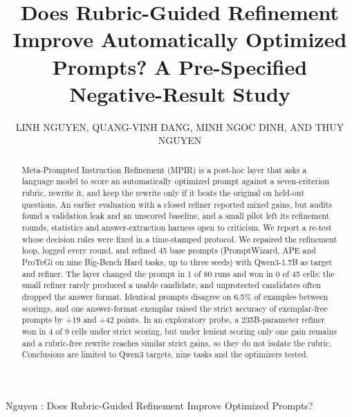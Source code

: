 \documentclass{ieeeaccess}
\begin{document}
\renewcommand{\thesection}{\arabic{section}}
\renewcommand{\thesubsection}{\thesection.\arabic{subsection}}
\renewcommand{\thesubsubsection}{\thesubsection.\arabic{subsubsection}}
\def\thesectiondis{\thesection.}
\def\thesubsectiondis{\thesection.\arabic{subsection}}
\def\thesubsubsectiondis{\thesection.\arabic{subsection}.\arabic{subsubsection}}


\title{Does Rubric-Guided Refinement Improve Automatically Optimized Prompts? A Pre-Specified Negative-Result Study}

\author{\uppercase{Linh Nguyen}, \uppercase{Quang-Vinh Dang}, \uppercase{Minh Ngoc Dinh}, AND \uppercase{Thuy Nguyen}}

\address[1]{School of Science, Engineering \& Technology, RMIT University Vietnam, 702 Nguyen Van Linh Boulevard, Ho Chi Minh City 700000, Vietnam}
\address[2]{British University Vietnam, Hung Yen, Vietnam}
\address[3]{Millenia Education, Ho Chi Minh City, Vietnam}



{Nguyen \headeretal: Does Rubric-Guided Refinement Improve Optimized Prompts?}

\begin{abstract}
Meta-Prompted Instruction Refinement (MPIR) is a post-hoc layer that asks a language model to score an automatically optimized prompt against a seven-criterion rubric, rewrite it, and keep the rewrite only if it beats the original on held-out questions. An earlier evaluation with a closed refiner reported mixed gains, but audits found a validation leak and an unscored baseline, and a small pilot left its refinement rounds, statistics and answer-extraction harness open to criticism. We report a re-test whose decision rules were fixed in a time-stamped protocol. We repaired the refinement loop, logged every round, and refined 45 base prompts (PromptWizard, APE and ProTeGi on nine Big-Bench Hard tasks, up to three seeds) with Qwen3-1.7B as target and refiner. The layer changed the prompt in 1 of 80 runs and won in 0 of 45 cells: the small refiner rarely produced a usable candidate, and unprotected candidates often dropped the answer format. Identical prompts disagree on 6.5\% of examples between scorings, and one answer-format exemplar raised the strict accuracy of exemplar-free prompts by +19 and +42 points. In an exploratory probe, a 235B-parameter refiner won in 4 of 9 cells under strict scoring, but under lenient scoring only one gain remains and a rubric-free rewrite reaches similar strict gains, so they do not isolate the rubric. Conclusions are limited to Qwen3 targets, nine tasks and the optimizers tested.
\end{abstract}
\end{document}
